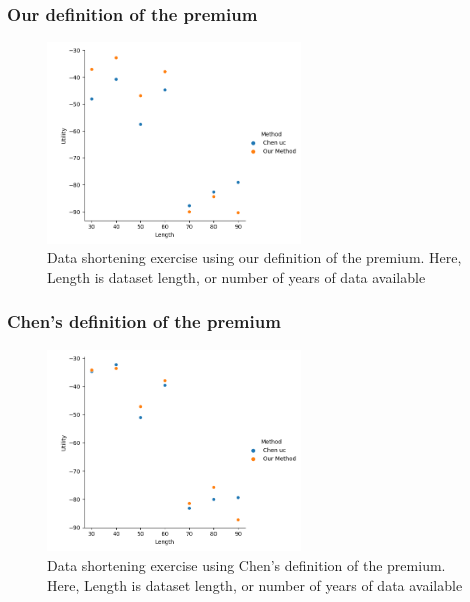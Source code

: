 \documentclass[11pt]{article}
\begin{document}
  \subsubsection{Our definition of the premium}
  \begin{figure}[h]
    \centering
    \includegraphics[width=0.6\textwidth]{../../../output/figures/Chen_Replication/Our_premium_results.png}
    \caption{Data shortening exercise using our definition of the premium. Here, Length is dataset length, or number of years of data available}
  \end{figure}
  \FloatBarrier
  \subsubsection{Chen's definition of the premium}
  \begin{figure}[h]
    \centering
    \includegraphics[width=0.6\textwidth]{../../../output/figures/Chen_Replication/chen_premium_results.png}
    \caption{Data shortening exercise using Chen's definition of the premium. Here, Length is dataset length, or number of years of data available}
  \end{figure}
  \FloatBarrier
\end{document}
